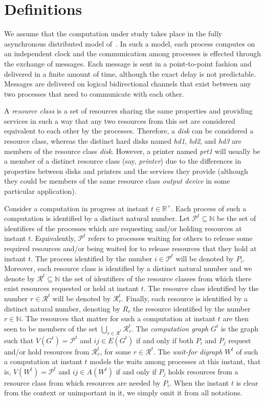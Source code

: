 \documentclass{article}
\newcommand{\Nat}{{\mathbb N}}
\newcommand{\Real}{{\mathbb R}}
\newcommand{\R}{\mathcal{R}}
\begin{document}
\section{Definitions}

We assume that the computation under study takes place in the fully asynchronous
distributed model of~\cite{LivroValmir}. In such a model, each process computes
on an independent clock and the communication among processes is effected
through the exchange of messages. Each message is sent in a point-to-point
fashion and delivered in a finite amount of time, although the exact delay is
not predictable. Messages are delivered on logical bidirectional channels that
exist between any two processes that need to communicate with each other.

A \emph{resource class} is a set of resources sharing the same properties and
providing services in such a way that any two resources from this set are
considered equivalent to each other by the processes. Therefore, a \emph{disk}
can be considered a resource class, whereas the distinct hard disks named
\emph{hd1}, \emph{hd2}, and \emph{hd3} are members of the resource class
\emph{disk}. However, a printer named \emph{prt1} will usually be a member of a
distinct resource class (say, \emph{printer}) due to the differences in
properties between disks and printers and the services they provide (although
they could be members of the same resource class \emph{output device} in some
particular application). 

Consider a computation in progress at instant $t \in \Real^+$. Each process of
such a computation is identified by a distinct natural number. Let
$\mathcal{P}^t \subseteq \Nat$ be the set of identifiers of the processes which
are requesting and/or holding resources at instant $t$. Equivalently,
$\mathcal{P}^t$ refers to processes waiting for others to release some required
resources and/or being waited for to release resources that they hold at instant
$t$. The process identified by the number $i \in \mathcal{P}^t$ will be denoted
by $P_i$. Moreover, each resource class is identified by a distinct natural
number and we denote by $\R^t \subseteq \Nat$ the set of identifiers of the
resource classes from which there exist resources requested or held at instant
$t$. The resource class identified by the number $r \in \R^t$ will be denoted by
$\R^t_r$. Finally, each resource is identified by a distinct natural number,
denoting by $R_r$ the resource identified by the number $r \in \Nat$. The
resources that matter for such a computation at instant $t$ are then seen to be
members of the set $\bigcup_{r \in \R^t} \R^t_r$. The \emph{computation graph}
$G^t$ is the graph such that $V(G^t) = \mathcal{P}^t$ and $ij \in E(G^t)$ if and
only if both $P_i$ and $P_j$ request and/or hold resources from $\R^t_r$, for
some $r \in \R^t$. The \emph{wait-for digraph} $W^t$ of such a computation at
instant $t$ models the waits among processes at this instant, that is,
$V(W^t) = \mathcal{P}^t$ and $ij \in A(W^t)$ if and only if $P_j$ holds
resources from a resource class from which resources are needed by $P_i$. When
the instant $t$ is clear from the context or unimportant in it, we simply omit
it from all notations. 
\end{document}
